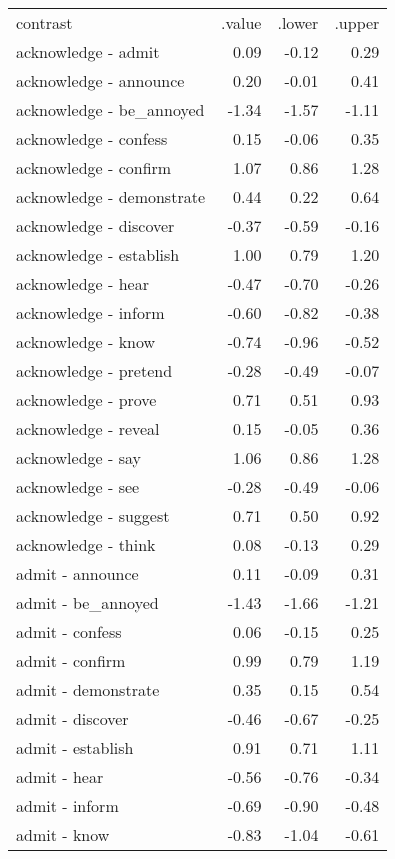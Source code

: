 \begin{longtable}{lrrr}
 contrast & .value & .lower & .upper \\ 
 acknowledge - admit & 0.09 & -0.12 & 0.29 \\ 
  acknowledge - announce & 0.20 & -0.01 & 0.41 \\ 
  acknowledge - be_annoyed & -1.34 & -1.57 & -1.11 \\ 
  acknowledge - confess & 0.15 & -0.06 & 0.35 \\ 
  acknowledge - confirm & 1.07 & 0.86 & 1.28 \\ 
  acknowledge - demonstrate & 0.44 & 0.22 & 0.64 \\ 
  acknowledge - discover & -0.37 & -0.59 & -0.16 \\ 
  acknowledge - establish & 1.00 & 0.79 & 1.20 \\ 
  acknowledge - hear & -0.47 & -0.70 & -0.26 \\ 
  acknowledge - inform & -0.60 & -0.82 & -0.38 \\ 
  acknowledge - know & -0.74 & -0.96 & -0.52 \\ 
  acknowledge - pretend & -0.28 & -0.49 & -0.07 \\ 
  acknowledge - prove & 0.71 & 0.51 & 0.93 \\ 
  acknowledge - reveal & 0.15 & -0.05 & 0.36 \\ 
  acknowledge - say & 1.06 & 0.86 & 1.28 \\ 
  acknowledge - see & -0.28 & -0.49 & -0.06 \\ 
  acknowledge - suggest & 0.71 & 0.50 & 0.92 \\ 
  acknowledge - think & 0.08 & -0.13 & 0.29 \\ 
  admit - announce & 0.11 & -0.09 & 0.31 \\ 
  admit - be_annoyed & -1.43 & -1.66 & -1.21 \\ 
  admit - confess & 0.06 & -0.15 & 0.25 \\ 
  admit - confirm & 0.99 & 0.79 & 1.19 \\ 
  admit - demonstrate & 0.35 & 0.15 & 0.54 \\ 
  admit - discover & -0.46 & -0.67 & -0.25 \\ 
  admit - establish & 0.91 & 0.71 & 1.11 \\ 
  admit - hear & -0.56 & -0.76 & -0.34 \\ 
  admit - inform & -0.69 & -0.90 & -0.48 \\ 
  admit - know & -0.83 & -1.04 & -0.61 \\ 

\end{longtable}
